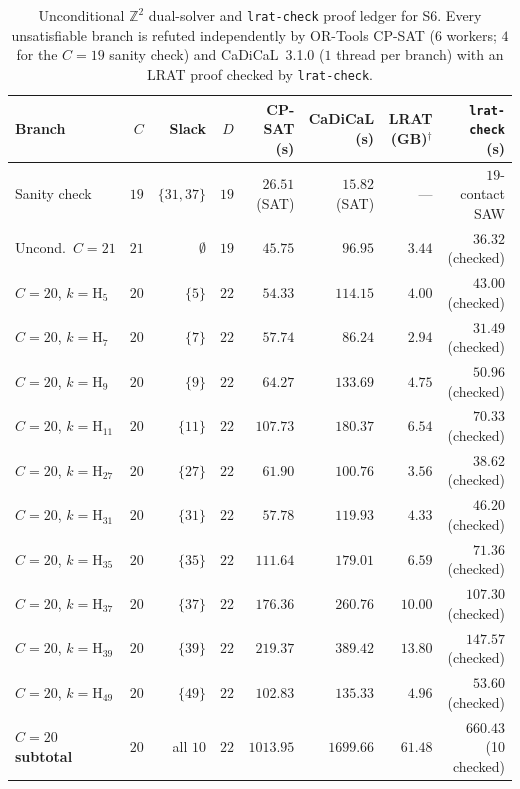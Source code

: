 \documentclass[11pt]{article}
\newcommand{\Z}{\mathbb{Z}}
\begin{document}
\begin{table}[t]
\centering
\caption{Unconditional $\Z^2$ dual-solver and \texttt{lrat-check} proof ledger for S6. Every unsatisfiable branch is refuted independently by OR-Tools CP-SAT ($6$ workers; $4$ for the $C = 19$ sanity check) and CaDiCaL~3.1.0 ($1$ thread per branch) with an LRAT proof checked by \texttt{lrat-check}.}
\label{tab:s6cases}
\scriptsize
\setlength{\tabcolsep}{5pt}
\begin{tabular}{@{}lrrrrrrr@{}}
\toprule
\textbf{Branch} & \textbf{$C$} & \textbf{Slack} & \textbf{$D$} & \textbf{CP-SAT (s)} & \textbf{CaDiCaL (s)} & \textbf{LRAT (GB)$^{\dagger}$} & \textbf{\texttt{lrat-check} (s)} \\
\midrule
Sanity check & $19$ & $\{31, 37\}$ & $19$ & $26.51$ (SAT) & $15.82$ (SAT) & --- & $19$-contact SAW \\
\midrule
Uncond.\ $C = 21$ & $21$ & $\emptyset$ & $19$ & $45.75$ & $96.95$ & $3.44$ & $36.32$ (checked) \\
\midrule
$C = 20$, $k = \mathrm{H}_5$ & $20$ & $\{5\}$ & $22$ & $54.33$ & $114.15$ & $4.00$ & $43.00$ (checked) \\
$C = 20$, $k = \mathrm{H}_7$ & $20$ & $\{7\}$ & $22$ & $57.74$ & $86.24$ & $2.94$ & $31.49$ (checked) \\
$C = 20$, $k = \mathrm{H}_9$ & $20$ & $\{9\}$ & $22$ & $64.27$ & $133.69$ & $4.75$ & $50.96$ (checked) \\
$C = 20$, $k = \mathrm{H}_{11}$ & $20$ & $\{11\}$ & $22$ & $107.73$ & $180.37$ & $6.54$ & $70.33$ (checked) \\
$C = 20$, $k = \mathrm{H}_{27}$ & $20$ & $\{27\}$ & $22$ & $61.90$ & $100.76$ & $3.56$ & $38.62$ (checked) \\
$C = 20$, $k = \mathrm{H}_{31}$ & $20$ & $\{31\}$ & $22$ & $57.78$ & $119.93$ & $4.33$ & $46.20$ (checked) \\
$C = 20$, $k = \mathrm{H}_{35}$ & $20$ & $\{35\}$ & $22$ & $111.64$ & $179.01$ & $6.59$ & $71.36$ (checked) \\
$C = 20$, $k = \mathrm{H}_{37}$ & $20$ & $\{37\}$ & $22$ & $176.36$ & $260.76$ & $10.00$ & $107.30$ (checked) \\
$C = 20$, $k = \mathrm{H}_{39}$ & $20$ & $\{39\}$ & $22$ & $219.37$ & $389.42$ & $13.80$ & $147.57$ (checked) \\
$C = 20$, $k = \mathrm{H}_{49}$ & $20$ & $\{49\}$ & $22$ & $102.83$ & $135.33$ & $4.96$ & $53.60$ (checked) \\
\midrule
\textbf{$C = 20$ subtotal} & $20$ & all $10$ & $22$ & $1013.95$ & $1699.66$ & $61.48$ & $660.43$ (10 checked) \\

\end{tabular}
\end{table}
\end{document}
